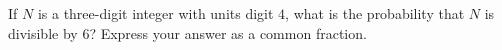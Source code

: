 If $N$ is a three-digit integer with units digit $4$, what is the probability that $N$ is divisible by $6$? Express your answer as a common fraction.
